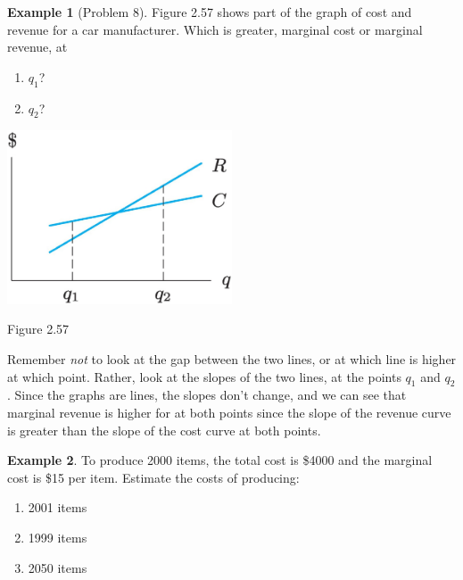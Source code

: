 \documentclass[oneside]{book}
\theoremstyle{definition}
\newtheorem{example}{Example}
\theoremstyle{solution}
\newtheorem*{solution}{Solution}
\newenvironment{solution}{\vspace{2in}\comment}{\endcomment}
\begin{document}
\begin{example}[Problem 8]
Figure 2.57 shows part of the graph of cost and revenue for a car
  manufacturer. Which is greater, marginal cost or marginal revenue,
  at
  \begin{enumerate}
  \item $q_1$?
  \item $q_2$?
  \end{enumerate}
  \begin{center}
    \includegraphics[width=0.5\textwidth]{Images/s2-5prob8}

{\Large Figure 2.57}
  \end{center}
\end{example}

\begin{solution} 
  Remember \emph{not} to look at the gap between the two lines, or at
  which line is higher at which point.  Rather, look at the slopes of
  the two lines, at the points $q_1$ and $q_2$.  Since the graphs are
  lines, the slopes don't change, and we can see that marginal revenue
  is higher for at both points since the slope of the revenue curve is
  greater than the slope of the cost curve at both points.
\end{solution}

\begin{example}
  To produce 2000 items, the total cost is \$4000 and the marginal
  cost is \$15 per item. Estimate the costs of producing:
  \begin{enumerate}
  \item 2001 items
  \item 1999 items
  \item 2050 items
  \end{enumerate}
\end{example}
\end{document}
